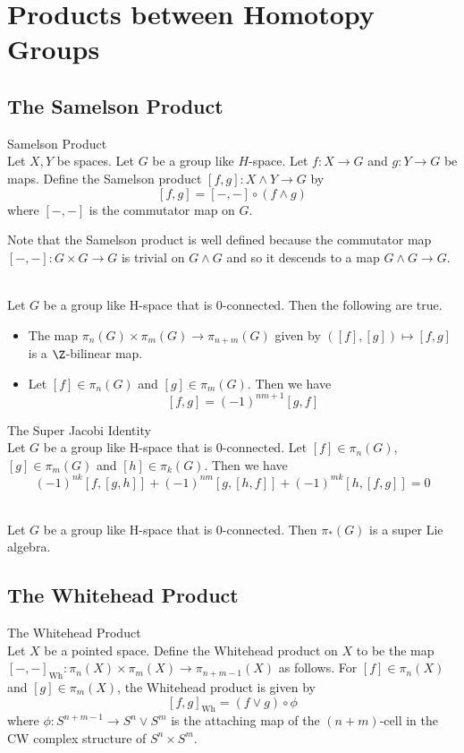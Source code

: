 \documentclass[a4paper]{article}
\begin{document}
\pagebreak
\section{Products between Homotopy Groups}
\subsection{The Samelson Product}
\begin{defn}{Samelson Product}{}\\
Let $X,Y$ be spaces. Let $G$ be a group like $H$-space. Let $f:X\to G$ and $g:Y\to G$ be maps. Define the Samelson product $[f,g]:X\wedge Y\to G$ by $$[f,g]=[-,-]\circ(f\wedge g)$$ where $[-,-]$ is the commutator map on $G$. 
\end{defn}

Note that the Samelson product is well defined because the commutator map $[-,-]:G\times G\to G$ is trivial on $G\wedge G$ and so it descends to a map $G\wedge G\to G$.

\begin{prp}{}{}\\
Let $G$ be a group like H-space that is $0$-connected. Then the following are true. 
\begin{itemize}
\item The map $\pi_n(G)\times\pi_m(G)\to\pi_{n+m}(G)$ given by $([f],[g])\mapsto[f,g]$ is a $\Z$-bilinear map. 
\item Let $[f]\in\pi_n(G)$ and $[g]\in\pi_m(G)$. Then we have $$[f,g]=(-1)^{nm+1}[g,f]$$
\end{itemize}
\end{prp}

\begin{prp}{The Super Jacobi Identity}{}\\
Let $G$ be a group like H-space that is $0$-connected. Let $[f]\in\pi_n(G)$, $[g]\in\pi_m(G)$ and $[h]\in\pi_k(G)$. Then we have $$(-1)^{nk}[f,[g,h]]+(-1)^{nm}[g,[h,f]]+(-1)^{mk}[h,[f,g]]=0$$
\end{prp}

\begin{crl}{}{}\\
Let $G$ be a group like H-space that is $0$-connected. Then $\pi_\ast(G)$ is a super Lie algebra. 
\end{crl}

\subsection{The Whitehead Product}
\begin{defn}{The Whitehead Product}{}\\
Let $X$ be a pointed space. Define the Whitehead product on $X$ to be the map $[-,-]_\text{Wh}:\pi_n(X)\times\pi_m(X)\to\pi_{n+m-1}(X)$ as follows. For $[f]\in\pi_n(X)$ and $[g]\in\pi_m(X)$, the Whitehead product is given by $$[f,g]_\text{Wh}=(f\vee g)\circ\phi$$ where $\phi:S^{n+m-1}\to S^n\vee S^m$ is the attaching map of the $(n+m)$-cell in the CW complex structure of $S^n\times S^m$. 
\end{defn}
\end{document}
